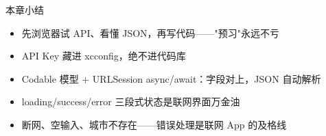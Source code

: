 \begin{tcbsummary}{本章小结}
\begin{itemize}
  \item 先浏览器试 API、看懂 JSON，再写代码——"预习"永远不亏
  \item API Key 藏进 xcconfig，绝不进代码库
  \item Codable 模型 + URLSession async/await：字段对上，JSON 自动解析
  \item loading/success/error 三段式状态是联网界面万金油
  \item 断网、空输入、城市不存在——错误处理是联网 App 的及格线
\end{itemize}

\end{tcbsummary}
